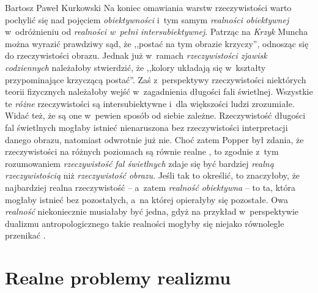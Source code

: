 \begin{artplenv}{Bartosz Paweł Kurkowski}
Na koniec omawiania warstw rzeczywistości warto pochylić się nad pojęciem \textit{obiektywności} i~tym samym
\textit{realności obiektywnej} w~odróżnieniu od \textit{realności w~pełni intersubiektywnej}. Patrząc na \textit{Krzyk} Muncha
można wyrazić prawdziwy sąd, że ,,postać na tym obrazie krzyczy'', odnosząc się do rzeczywistości obrazu. Jednak
już w~ramach \textit{rzeczywistości zjawisk codziennych} należałoby stwierdzić, że ,,kolory układają się w~kształty
przypominające krzyczącą postać''. Zaś z~perspektywy rzeczywistości niektórych teorii fizycznych należałoby
wejść w~zagadnienia długości fali świetlnej. Wszystkie te \textit{różne }rzeczywistości są intersubiektywne i~dla większości
ludzi zrozumiałe. Widać też, że są one w~pewien sposób od siebie zależne. Rzeczywistość długości fal świetlnych mogłaby
istnieć nienaruszona bez rzeczywistości interpretacji danego obrazu, natomiast odwrotnie już nie. Choć zatem Popper był
zdania, że rzeczywistości na różnych poziomach są równie realne
\parencite[s.~265]{grobler_metodologia_2006},
to
zgodnie z~tym rozumowaniem \textit{rzeczywistość fal świetlnych} zdaje się być bardziej \textit{realną rzeczywistością}
niż \textit{rzeczywistość obrazu}. Jeśli tak to określić, to znaczyłoby, że najbardziej realna
rzeczywistość -- a~zatem\textit{ realność obiektywna} -- to ta, która mogłaby istnieć bez pozostałych, a~na której opierałyby się
pozostałe. Owa \textit{realność }niekoniecznie musiałaby być jedna, gdyż na przykład w~perspektywie dualizmu
antropologicznego takie realności mogłyby się niejako równolegle przenikać
\parencite[por.][]{judycki_swiadomosc_2004}.

\section{Realne problemy realizmu}


\end{artplenv}
